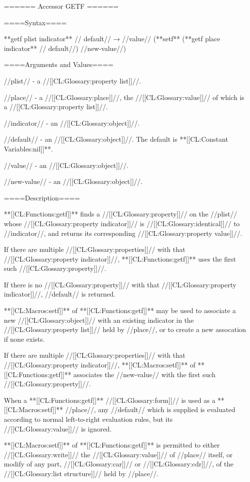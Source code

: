 ====== Accessor GETF ======

====Syntax====

**getf {plist indicator** //\opt} default// → //value// (**setf** (**getf {place indicator** //\opt} default//) //new-value//)

====Arguments and Values====

//plist// - a //[[CL:Glossary:property list]]//.

//place// - a //[[CL:Glossary:place]]//, the //[[CL:Glossary:value]]// of which is a //[[CL:Glossary:property list]]//.

//indicator// - an //[[CL:Glossary:object]]//.

//default// - an //[[CL:Glossary:object]]//. The default is **[[CL:Constant Variables:nil]]**.

//value// - an //[[CL:Glossary:object]]//.

//new-value// - an //[[CL:Glossary:object]]//.

====Description====

**[[CL:Functions:getf]]** finds a //[[CL:Glossary:property]]// on the //plist// whose //[[CL:Glossary:property indicator]]// is //[[CL:Glossary:identical]]// to //indicator//, and returns its corresponding //[[CL:Glossary:property value]]//.

If there are multiple //[[CL:Glossary:properties]]// with that //[[CL:Glossary:property indicator]]//, **[[CL:Functions:getf]]** uses the first such //[[CL:Glossary:property]]//.

If there is no //[[CL:Glossary:property]]// with that //[[CL:Glossary:property indicator]]//, //default// is returned.

**[[CL:Macros:setf]]** of **[[CL:Functions:getf]]** may be used to associate a new //[[CL:Glossary:object]]// with an existing indicator in the //[[CL:Glossary:property list]]// held by //place//, or to create a new assocation if none exists.

If there are multiple //[[CL:Glossary:properties]]// with that //[[CL:Glossary:property indicator]]//, **[[CL:Macros:setf]]** of **[[CL:Functions:getf]]** associates the //new-value// with the first such //[[CL:Glossary:property]]//.

When a **[[CL:Functions:getf]]** //[[CL:Glossary:form]]// is used as a **[[CL:Macros:setf]]** //place//, any //default// which is supplied is evaluated according to normal left-to-right evaluation rules, but its //[[CL:Glossary:value]]// is ignored.

**[[CL:Macros:setf]]** of **[[CL:Functions:getf]]** is permitted to either //[[CL:Glossary:write]]// the //[[CL:Glossary:value]]// of //place// itself, or modify of any part, //[[CL:Glossary:car]]// or //[[CL:Glossary:cdr]]//, of the //[[CL:Glossary:list structure]]// held by //place//.

